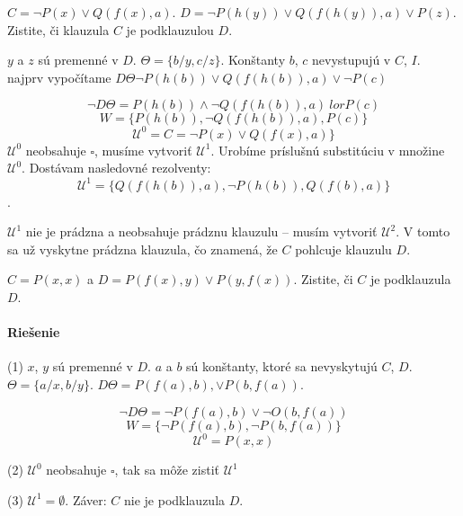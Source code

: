 \begin{priklad}
    $C = \neg P(x) \lor Q(f(x), a)$. $D = \neg P(h(y)) \lor
    Q(f(h(y)),a) \lor P(z)$. Zistite, či klauzula $C$ je podklauzulou $D$.

    \par $y$ a $z$ sú premenné v $D$. $\Theta = \{ b/y, c/z\}$. Konštanty $b$, $c$
    nevystupujú v $C$, $I$. najprv vypočítame $D\Theta \neg P(h(b)) \lor
    Q(f(h(b)),a) \lor \neg P(c)$

    $$\neg D \Theta = P(h(b)) \land \neg Q(f(h(b)),a) \ lor P(c)$$
    $$W = \{P(h(b)), \neg Q(f(h(b)),a), P(c) \}$$
    $$\mathcal{U}^0 = C = \neg P(x) \lor Q(f(x),a)\}$$
    $\mathcal{U}^0$ neobsahuje $\square$, musíme vytvoriť $\mathcal{U}^1$. Urobíme
    príslušnú substitúciu v množine $\mathcal{U}^0$. Dostávam nasledovné rezolventy:
    $$\mathcal{U}^1 = \{ Q(f(h(b)),a), \neg P(h(b)), Q(f(b),a)\}$$. 
    \par
    $\mathcal{U}^1$
    nie je prádzna a neobsahuje prádznu klauzulu -- musím vytvoriť $\mathcal{U}^2$.
    V tomto sa už vyskytne prádzna klauzula, čo znamená, že $C$ pohlcuje klauzulu
    $D$.
\end{priklad}

\begin{priklad}
    $C=P(x,x)$ a $D=P(f(x),y) \lor P(y,f(x))$. Zistite, či $C$
    je podklauzula $D$.

    \paragraph{Riešenie} (1) $x$, $y$ sú premenné v $D$. $a$ a $b$ sú konštanty,
    ktoré sa nevyskytujú $C$, $D$. $\Theta = \{ a/x, b/y\}$. $D\Theta = P(f(a),b), \lor P(b,
    f(a))$.

    $$\neg D\Theta = \neg P(f(a),b) \lor \neg O(b,f(a))$$
    $$W = \{ \neg P(f(a),b), \neg P(b,f(a))\}$$
    $$\mathcal{U}^0 = P(x,x)$$


    \par (2) $\mathcal{U}^0$ neobsahuje $\square$, tak sa môže zistiť
    $\mathcal{U}^1$
    \par (3) $\mathcal{U}^1 = \emptyset$. Záver: $C$ nie je podklauzula $D$.
\end{priklad}

